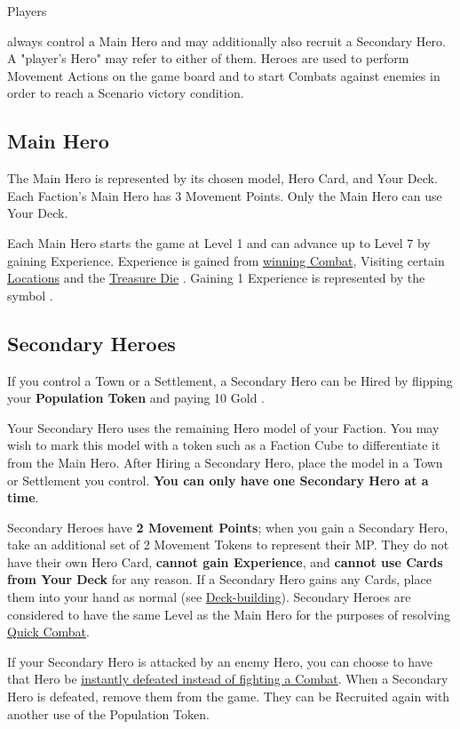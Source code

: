 
\begin{multicols*}{2}

\hypertarget{Heroes}{Players} always control a Main Hero and may additionally also recruit a Secondary Hero.
A "player's Hero" may refer to either of them.
Heroes are used to perform Movement Actions on the game board and to start Combats against enemies in order to reach a Scenario victory condition.

\subsection*{Main Hero}
The Main Hero is represented by its chosen model, Hero Card, and Your Deck.
Each Faction's Main Hero has 3 Movement Points.
Only the Main Hero can use Your Deck.\par
Each Main Hero starts the game at Level 1 and can advance up to Level 7 by gaining Experience.
Experience is gained from \hyperlink{Combatexperience}{winning Combat}, Visiting certain \hyperlink{All}{Locations} and the \hyperlink{Resources}{Treasure Die} .
Gaining 1 Experience is represented by the symbol .

\subsection*{\hypertarget{Secondary}{Secondary Heroes}}
If you control a Town or a Settlement, a Secondary Hero can be Hired by flipping your \textbf{Population Token} and paying 10 Gold .\par
{}\par
Your Secondary Hero uses the remaining Hero model of your Faction.
You may wish to mark this model with a token such as a Faction Cube to differentiate it from the Main Hero.
After Hiring a Secondary Hero, place the model in a Town or Settlement you control.
\textbf{You can only have one Secondary Hero at a time}.\par
Secondary Heroes have \textbf{2 Movement Points}; when you gain a Secondary Hero, take an additional set of 2 Movement Tokens to represent their MP.
They do not have their own Hero Card, \textbf{cannot gain Experience}, and \textbf{cannot use Cards from Your Deck} for any reason.
If a Secondary Hero gains any Cards, place them into your hand as normal (see \hyperlink{Playerdecks}{Deck-building}).
Secondary Heroes are considered to have the same Level as the Main Hero for the purposes of resolving \hyperlink{Quick}{Quick Combat}.\par
If your Secondary Hero is attacked by an enemy Hero, you can choose to have that Hero be \hyperlink{Endcombat}{instantly defeated instead of fighting a Combat}.
When a Secondary Hero is defeated, remove them from the game.
They can be Recruited again with another use of the Population Token.\par


\end{multicols*}
